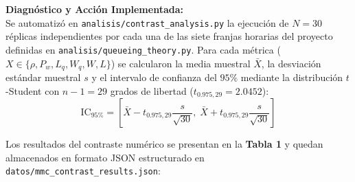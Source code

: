 \documentclass[11pt,letterpaper]{article}
\begin{document}
\vspace{0.4em}
\noindent \textbf{Diagnóstico y Acción Implementada:} \\
Se automatizó en \texttt{analisis/contrast\_analysis.py} la ejecución de $N = 30$ réplicas independientes por cada una de las siete franjas horarias del proyecto definidas en \texttt{analisis/queueing\_theory.py}. Para cada métrica ($X \in \{\rho, P_w, L_q, W_q, W, L\}$) se calcularon la media muestral $\bar{X}$, la desviación estándar muestral $s$ y el intervalo de confianza del $95\%$ mediante la distribución $t$-Student con $n - 1 = 29$ grados de libertad ($t_{0.975, 29} = 2.0452$):
\begin{equation}
    \text{IC}_{95\%} = \left[ \bar{X} - t_{0.975, 29} \frac{s}{\sqrt{30}}, \; \bar{X} + t_{0.975, 29} \frac{s}{\sqrt{30}} \right]
\end{equation}

\noindent Los resultados del contraste numérico se presentan en la \textbf{Tabla 1} y quedan almacenados en formato JSON estructurado en \texttt{datos/mmc\_contrast\_results.json}:
\end{document}
